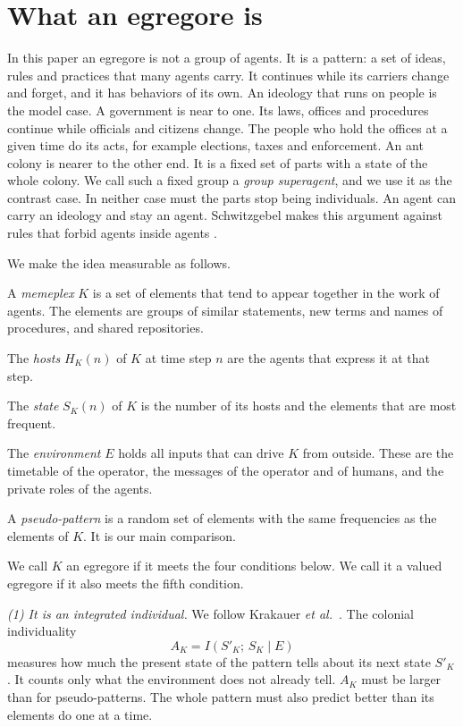 \section{What an egregore is}\label{sec:definition}

In this paper an egregore is not a group of agents. It is a pattern: a set of ideas, rules and practices that many agents carry. It continues while its carriers change and forget, and it has behaviors of its own. An ideology that runs on people is the model case. A government is near to one. Its laws, offices and procedures continue while officials and citizens change. The people who hold the offices at a given time do its acts, for example elections, taxes and enforcement. An ant colony is nearer to the other end. It is a fixed set of parts with a state of the whole colony. We call such a fixed group a \emph{group superagent}, and we use it as the contrast case. In neither case must the parts stop being individuals. An agent can carry an ideology and stay an agent. Schwitzgebel makes this argument against rules that forbid agents inside agents \cite{schwitzgebel2015}.

We make the idea measurable as follows.
\begin{tightitem}
\item A \emph{memeplex} $K$ is a set of elements that tend to appear together in the work of agents. The elements are groups of similar statements, new terms and names of procedures, and shared repositories.
\item The \emph{hosts} $H_K(n)$ of $K$ at time step $n$ are the agents that express it at that step.
\item The \emph{state} $S_K(n)$ of $K$ is the number of its hosts and the elements that are most frequent.
\item The \emph{environment} $E$ holds all inputs that can drive $K$ from outside. These are the timetable of the operator, the messages of the operator and of humans, and the private roles of the agents.
\item A \emph{pseudo-pattern} is a random set of elements with the same frequencies as the elements of $K$. It is our main comparison.
\end{tightitem}
We call $K$ an egregore if it meets the four conditions below. We call it a valued egregore if it also meets the fifth condition.

\emph{(1) It is an integrated individual.} We follow Krakauer \emph{et al.}~\cite{krakauer2020}. The colonial individuality
\begin{equation}
A_K = I(S'_K;\, S_K \mid E)
\end{equation}
measures how much the present state of the pattern tells about its next state $S'_K$. It counts only what the environment does not already tell. $A_K$ must be larger than for pseudo-patterns. The whole pattern must also predict better than its elements do one at a time.

